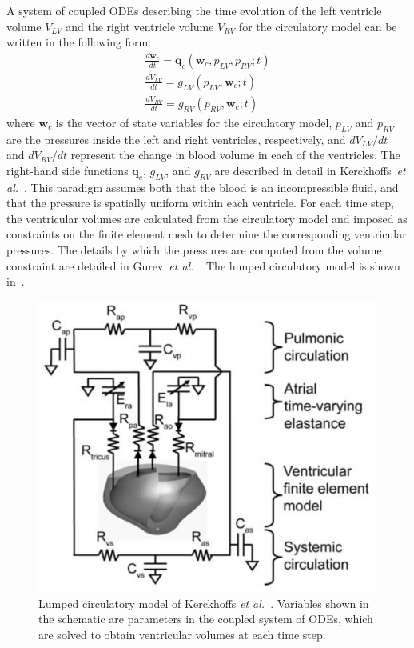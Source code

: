 A system of coupled ODEs describing the time evolution of the left ventricle volume $V_{LV}$ and the right ventricle volume $V_{RV}$ for the circulatory model can be written in the following form:
\begin{align}
\frac{d\bm{w}_{c}}{dt} = \bm{q}_c(\bm{w}_c, p_{LV}, p_{RV}; t) \\
\frac{dV_{LV}}{dt} = g_{LV}(p_{LV}, \bm{w}_c; t) \\
\frac{dV_{RV}}{dt} = g_{RV}(p_{RV}, \bm{w}_c; t)
\end{align}
where $\bm{w}_c$ is the vector of state variables for the circulatory model, $p_{LV}$ and $p_{RV}$ are the pressures inside the left and right ventricles, respectively, and ${dV_{LV}}/{dt}$ and ${dV_{RV}}/{dt}$ represent the change in blood volume in each of the ventricles. The right-hand side functions $\bm{q}_c$, $g_{LV}$, and $g_{RV}$ are described in detail in Kerckhoffs~\textit{et al.}~\cite{kerckhoffs_2006}. This paradigm assumes both that the blood is an incompressible fluid, and that the pressure is spatially uniform within each ventricle. For each time step, the ventricular volumes are calculated from the circulatory model and imposed as constraints on the finite element mesh to determine the corresponding ventricular pressures. The details by which the pressures are computed from the volume constraint are detailed in Gurev~\textit{et al.}~\cite{gurev_2015}. The lumped circulatory model is shown in~.
\begin{figure}[ht]
\centering
		\includegraphics[scale=0.3]{media/bcs.png}
\caption{Lumped circulatory model of Kerckhoffs \textit{et al.}~\cite{kerckhoffs_2006}. Variables shown in the schematic are parameters in the coupled system of ODEs, which are solved to obtain ventricular volumes at each time step.}
\label{fig:bcs}
\end{figure}

